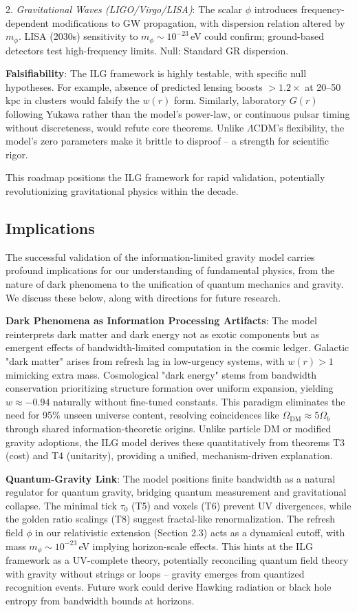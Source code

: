 \documentclass[12pt,a4paper]{article}
\begin{document}
2. \emph{Gravitational Waves (LIGO/Virgo/LISA)}: The scalar $\phi$ introduces frequency-dependent modifications to GW propagation, with dispersion relation altered by $m_\phi$. LISA (2030s) sensitivity to $m_\phi \sim 10^{-23}$\,eV could confirm; ground-based detectors test high-frequency limits. Null: Standard GR dispersion.

\textbf{Falsifiability}: The ILG framework is highly testable, with specific null hypotheses. For example, absence of predicted lensing boosts $>1.2\times$ at 20--50\,kpc in clusters would falsify the $w(r)$ form. Similarly, laboratory $G(r)$ following Yukawa rather than the model's power-law, or continuous pulsar timing without discreteness, would refute core theorems. Unlike $\Lambda$CDM's flexibility, the model's zero parameters make it brittle to disproof -- a strength for scientific rigor.

This roadmap positions the ILG framework for rapid validation, potentially revolutionizing gravitational physics within the decade.

\subsection{Implications}

The successful validation of the information-limited gravity model carries profound implications for our understanding of fundamental physics, from the nature of dark phenomena to the unification of quantum mechanics and gravity. We discuss these below, along with directions for future research.

\textbf{Dark Phenomena as Information Processing Artifacts}: The model reinterprets dark matter and dark energy not as exotic components but as emergent effects of bandwidth-limited computation in the cosmic ledger. Galactic "dark matter" arises from refresh lag in low-urgency systems, with $w(r) > 1$ mimicking extra mass. Cosmological "dark energy" stems from bandwidth conservation prioritizing structure formation over uniform expansion, yielding $w \approx -0.94$ naturally without fine-tuned constants. This paradigm eliminates the need for 95\% unseen universe content, resolving coincidences like $\Omega_\mathrm{DM} \approx 5 \Omega_b$ through shared information-theoretic origins. Unlike particle DM or modified gravity adoptions, the ILG model derives these quantitatively from theorems T3 (cost) and T4 (unitarity), providing a unified, mechanism-driven explanation.

\textbf{Quantum-Gravity Link}: The model positions finite bandwidth as a natural regulator for quantum gravity, bridging quantum measurement and gravitational collapse. The minimal tick $\tau_0$ (T5) and voxels (T6) prevent UV divergences, while the golden ratio scalings (T8) suggest fractal-like renormalization. The refresh field $\phi$ in our relativistic extension (Section 2.3) acts as a dynamical cutoff, with mass $m_\phi \sim 10^{-23}$\,eV implying horizon-scale effects. This hints at the ILG framework as a UV-complete theory, potentially reconciling quantum field theory with gravity without strings or loops -- gravity emerges from quantized recognition events. Future work could derive Hawking radiation or black hole entropy from bandwidth bounds at horizons.
\end{document}
